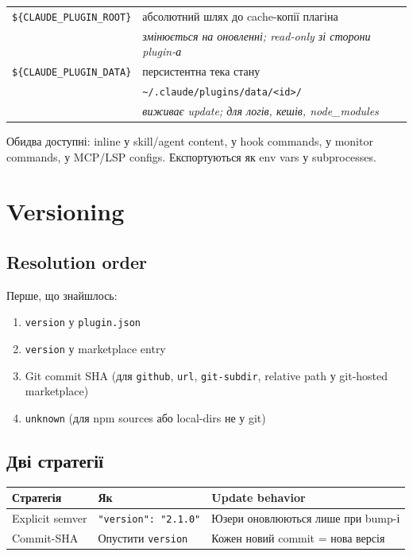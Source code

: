 \documentclass[11pt,a4paper]{article}
\begin{document}
\begin{tabular}{ll}
\hline
\texttt{\$\{CLAUDE\_PLUGIN\_ROOT\}} & абсолютний шлях до cache-копії плагіна \\
& \emph{змінюється на оновленні; read-only зі сторони plugin-а} \\
\hline
\texttt{\$\{CLAUDE\_PLUGIN\_DATA\}} & персистентна тека стану \\
& \texttt{\textasciitilde/.claude/plugins/data/<id>/} \\
& \emph{виживає update; для логів, кешів, node\_modules} \\
\hline
\end{tabular}

Обидва доступні: inline у skill/agent content, у hook commands, у monitor commands, у MCP/LSP configs. Експортуються як env vars у subprocesses.

\section{Versioning}

\subsection{Resolution order}

Перше, що знайшлось:

\begin{enumerate}
\item \texttt{version} у \texttt{plugin.json}
\item \texttt{version} у marketplace entry
\item Git commit SHA (для \texttt{github}, \texttt{url}, \texttt{git-subdir}, relative path у git-hosted marketplace)
\item \texttt{unknown} (для npm sources або local-dirs не у git)
\end{enumerate}

\subsection{Дві стратегії}

\begin{tabular}{lll}
\hline
\textbf{Стратегія} & \textbf{Як} & \textbf{Update behavior} \\
\hline
Explicit semver & \texttt{"version": "2.1.0"} & Юзери оновлюються лише при bump-і \\
Commit-SHA & Опустити \texttt{version} & Кожен новий commit = нова версія \\
\hline
\end{tabular}
\end{document}
